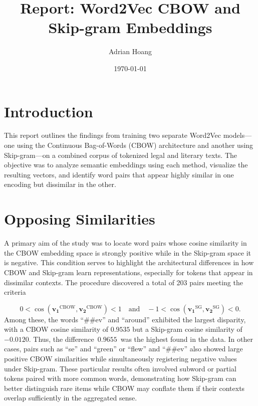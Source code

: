 \documentclass[12pt]{article}
\begin{document}
\title{\textbf{Report: Word2Vec CBOW and Skip-gram Embeddings}}
\author{Adrian Hoang}
\date{\today}
\maketitle

\section*{Introduction}
This report outlines the findings from training two separate Word2Vec models---one using the Continuous Bag-of-Words (CBOW) architecture and another using Skip-gram---on a combined corpus of tokenized legal and literary texts. The objective was to analyze semantic embeddings using each method, visualize the resulting vectors, and identify word pairs that appear highly similar in one encoding but dissimilar in the other.

\section*{Opposing Similarities}
A primary aim of the study was to locate word pairs whose cosine similarity in the CBOW embedding space is strongly positive while in the Skip-gram space it is negative. This condition serves to highlight the architectural differences in how CBOW and Skip-gram learn representations, especially for tokens that appear in dissimilar contexts. The procedure discovered a total of 203 pairs meeting the criteria

\[
0 < \cos(\mathbf{v_1}^{\text{CBOW}}, \mathbf{v_2}^{\text{CBOW}}) < 1
\quad \text{and} \quad
-1 < \cos(\mathbf{v_1}^{\text{SG}}, \mathbf{v_2}^{\text{SG}}) < 0.
\]
Among these, the words ``\#\#ev'' and ``around'' exhibited the largest disparity, with a CBOW cosine similarity of \(0.9535\) but a Skip-gram cosine similarity of \(-0.0120\). Thus, the difference \(\,0.9655\,\) was the highest found in the data. In other cases, pairs such as ``se'' and ``green'' or ``flew'' and ``\#\#ev'' also showed large positive CBOW similarities while simultaneously registering negative values under Skip-gram. These particular results often involved subword or partial tokens paired with more common words, demonstrating how Skip-gram can better distinguish rare items while CBOW may conflate them if their contexts overlap sufficiently in the aggregated sense.
\end{document}
